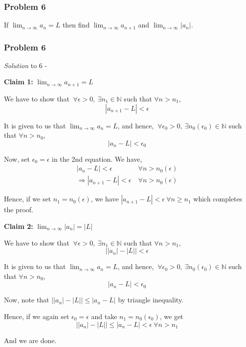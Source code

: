 \documentclass[
	11pt, %
]{beamer}
\begin{document}
\begin{frame}
	\frametitle{Problem 6}
	
	\begin{block}{6}
		If $\lim_{n \to \infty} a_n = L$ then find $\lim_{n \to \infty} a_{n+1}$ and $\lim_{n \to \infty} |a_n|$.
	\end{block}
	
\end{frame}

\begin{frame}[t]
	\frametitle{Problem 6}

	\textit{Solution} to 6 -

	\bigskip

	\textbf{Claim 1:} $\lim_{n \to \infty} a_{n+1} = L$

	\medskip

	We have to show that $~ \forall \epsilon > 0, ~ \exists n_1 \in \mathbb{N}$ such that $\forall n > n_1$, 
	\[ \left | a_{n+1} - L \right | < \epsilon\]

	It is given to us that $\lim _{n \to \infty} a_n = L$, and hence, $~ \forall \epsilon_0 > 0, ~ \exists n_0(\epsilon_0) \in \mathbb{N}$ such that $\forall n > n_0$, 
	\[ \left | a_{n} - L \right | < \epsilon_0\]

	Now, set $\epsilon_0 = \epsilon$ in the 2nd equation.
	We have,
	\begin{align*}
		|a_n - L| < \epsilon ~ &\forall n > n_0(\epsilon) \\
		\Rightarrow |a_{n+1} - L| < \epsilon ~ &\forall n > n_0(\epsilon)
	\end{align*}

\end{frame}

\begin{frame}[t]
	Hence, if we set $n_1 = n_0(\epsilon)$, we have $\left | a_{n+1} - L \right | < \epsilon ~ \forall n \geq n_1$ which completes the proof.

	\bigskip

	\textbf{Claim 2:} $\lim_{n \to \infty} |a_n| = |L|$

	\medskip

	We have to show that $~ \forall \epsilon > 0, ~ \exists n_1 \in \mathbb{N}$ such that $\forall n > n_1$, 
	\[ \left | |a_n| - |L| \right | < \epsilon\]

	It is given to us that $\lim _{n \to \infty} a_n = L$, and hence, $~ \forall \epsilon_0 > 0, ~ \exists n_0(\epsilon_0) \in \mathbb{N}$ such that $\forall n > n_0$, 
	\[ \left | a_{n} - L \right | < \epsilon_0\]

	Now, note that $\left | |a_n| - |L| \right | \leq |a_n - L|$ by triangle inequality.

	\smallskip

	Hence, if we again set $\epsilon_0 = \epsilon$ and take $n_1 = n_0(\epsilon_0)$, we get
	\[\left | |a_n| - |L| \right | \leq |a_n - L| < \epsilon ~ \forall n > n_1\]

	And we are done.
	
\end{frame}
\end{document}
